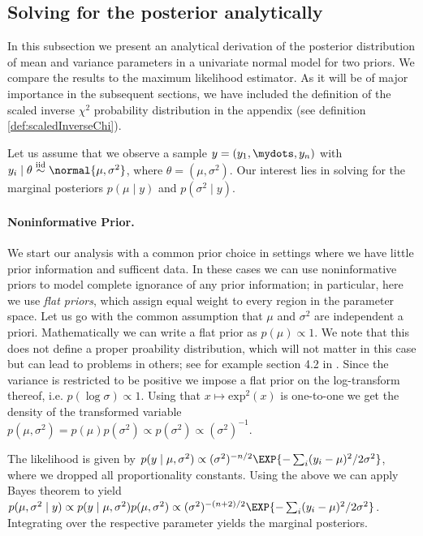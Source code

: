 \subsection{Solving for the posterior analytically}
In this subsection we present an analytical derivation of the posterior distribution of mean and variance parameters in a univariate normal model for two priors.
We compare the results to the maximum likelihood estimator.
As it will be of major importance in the subsequent sections, we have included the definition of the scaled inverse $\chi^2$ probability distribution in the appendix (see definition \ref{def:scaledInverseChi}).

Let us assume that we observe a sample $y = (y_1, \mydots, y_n)$
with $y_i \mid \theta \overset{\text{iid}}{\sim} \normal{\mu, \sigma^2}$, where $\theta = (\mu, \sigma^2)$.
Our interest lies in solving for the marginal posteriors $p(\mu \mid y)$ and $p(\sigma^2 \mid y)$.

\paragraph{Noninformative Prior.}
We start our analysis with a common prior choice in settings where we have little prior information and sufficent data.
In these cases we can use noninformative priors to model complete ignorance of any prior information; in particular, here we use \emph{flat priors}, which assign equal weight to every region in the parameter space.
Let us go with the common assumption that $\mu$ and $\sigma^2$ are independent a priori.
Mathematically we can write a flat prior as $p(\mu) \propto 1$.
We note that this does not define a proper proability distribution, which will not matter in this case but can lead to problems in others; see for example section 4.2 in \citet{kass1996}.
Since the variance is restricted to be positive we impose a flat prior on the log-transform thereof, i.e. $p(\log \sigma) \propto 1$.
Using that $x \mapsto \text{exp}^2(x)$ is one-to-one we get the density of the transformed variable $p(\mu, \sigma^2) = p(\mu)p(\sigma^2) \propto p(\sigma^2) \propto (\sigma^2)^{-1}$.

The likelihood is given by $p(y \mid \mu, \sigma^2) \propto (\sigma^2)^{-n/2} \EXP{-\sum_i (y_i - \mu)^2/2\sigma^2}$, where we dropped all proportionality constants.
Using the above we can apply Bayes theorem to yield $p(\mu, \sigma^2 \mid y) \propto p(y \mid \mu, \sigma^2) p(\mu, \sigma^2) \propto (\sigma^2)^{-(n+2)/2} \EXP{-\sum_i (y_i - \mu)^2/2\sigma^2}$.
Integrating over the respective parameter yields the marginal posteriors.

